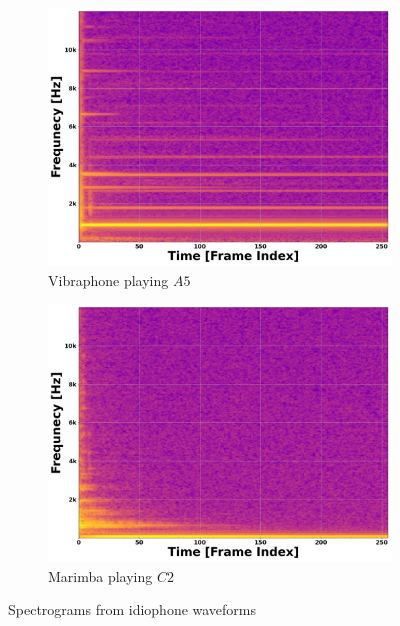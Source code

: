 \documentclass[12pt,letterpaper]{article}
\begin{document}
\begin{figure}[H]
	\begin{subfigure}[b]{0.45\textwidth}
	\centering
	\includegraphics[scale=0.2]{../FiguresSpectrogram/Vibraphone-A5}
	\caption{Vibraphone playing $A5$}
	\end{subfigure}
	\hfill
	\begin{subfigure}[b]{0.45\textwidth}
	\centering
	\includegraphics[scale=0.2]{../FiguresSpectrogram/Marimba-C2}
	\caption{Marimba playing $C2$}
	\end{subfigure}
\caption{Spectrograms from idiophone waveforms}
\label{fig-PropertiesIdiophones}
\end{figure}
\end{document}
